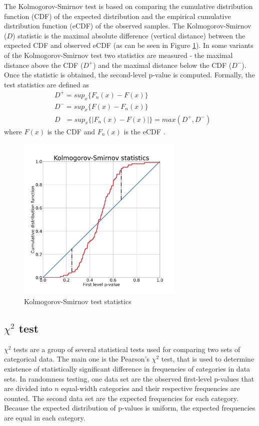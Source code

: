 \documentclass[
  digital,     %
  oneside,     %
  nosansbold,  %
  nocolorbold, %
  nolof,         %
  nolot,         %
]{fithesis4}
\begin{document}
The Kolmogorov-Smirnov test is based on comparing the cumulative distribution function (CDF) of the expected distribution and the empirical cumulative distribution function (eCDF) of the observed samples. The Kolmogorov-Smirnov ($D$) statistic is the maximal absolute difference (vertical distance) between the expected CDF and observed eCDF (as can be seen in Figure \ref{fig:ks_d}). In some variants of the Kolmogorov-Smirnov test two statistics are measured - the maximal distance above the CDF ($D^+$) and the maximal distance below the CDF ($D^-$). Once the statistic is obtained, the second-level p-value is computed. Formally, the test statistics are defined as
\[\begin{split}
    &D^+ = sup_x\{F_n(x) - F(x)\}\\
    &D^- = sup_x\{F(x) - F_n(x)\}\\
    &D \:\:\:= sup_x\{|F_n(x) - F(x)|\} = max(D^+, D^-)
\end{split}
\] where $F(x)$ is the CDF and $F_n(x)$ is the  eCDF \cite[p. 100]{GOF-techniques}.

\begin{figure}
  \begin{center}
    \includegraphics[width=8cm]{figures/ks_d.png}
  \end{center}
  \caption{Kolmogorov-Smirnov test statistics}
  \label{fig:ks_d}
\end{figure}


\subsection{$\chi^2$ test}
$\chi^2$ tests are a group of several statistical tests used for comparing two sets of categorical data. The main one is the Pearson's $\chi^2$ test, that is used to determine existence of statistically significant difference in frequencies of categories in data sets. In randomness testing, one data set are the observed first-level p-values that are divided into $n$ equal-width categories and their respective frequencies are counted. The second data set are the expected frequencies for each category. Because the expected distribution of p-values is uniform, the expected frequencies are equal in each category. 
 
\end{document}

